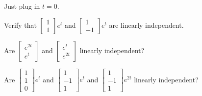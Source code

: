 \documentclass{ximera}
\begin{document}
\begin{exercise}
    \begin{hint}
         Just plug in $t=0$.
    \end{hint}
    Verify that
    $\left[ 
        \begin{smallmatrix}
            1 \\ 
            1
        \end{smallmatrix} 
    \right] 
    e^{t}$ and
    $\left[ 
        \begin{smallmatrix}
            1 \\ 
            -1
        \end{smallmatrix} 
    \right] e^{t}$ 
    are linearly independent. 
\end{exercise}


\begin{exercise}%
    Are
    $\left[ 
        \begin{smallmatrix}
            e^{2t} \\ 
            e^t
        \end{smallmatrix}
    \right]$
    and
    $\left[ 
        \begin{smallmatrix}
            e^{t} \\ 
            e^{2t}
        \end{smallmatrix}
    \right]$
    linearly independent?
    \begin{multipleChoice}
    \end{multipleChoice}
\end{exercise}

\begin{exercise}
    Are
    $\left[ 
        \begin{smallmatrix}
            1 \\ 
            1 \\ 
            0
        \end{smallmatrix} 
    \right] e^{t}$ 
    and
    $\left[ 
        \begin{smallmatrix}
            1 \\ 
            -1 \\ 
            1
        \end{smallmatrix} 
    \right] e^{t}$ 
    and
    $\left[ 
        \begin{smallmatrix}
            1 \\ 
            -1 \\ 
            1
        \end{smallmatrix} 
    \right] e^{2t}$ 
    linearly independent? %
    \begin{multipleChoice}
    \end{multipleChoice}
\end{exercise}
\end{document}
